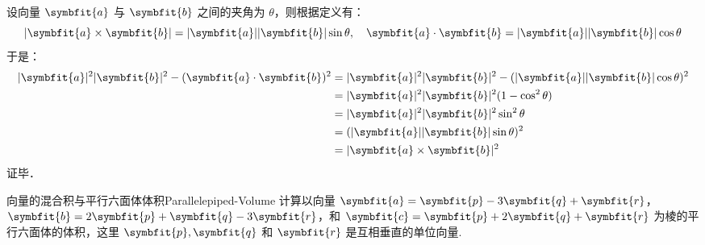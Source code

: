 \begin{myproof}
    设向量 $\symbfit{a}$ 与 $\symbfit{b}$ 之间的夹角为 $\theta$，则根据定义有：
    \begin{equation}
        |\symbfit{a} \times \symbfit{b}| = |\symbfit{a}| |\symbfit{b}| \sin \theta, \quad \symbfit{a} \cdot \symbfit{b} = |\symbfit{a}| |\symbfit{b}| \cos \theta
    \end{equation}
    于是：
    \begin{equation}
        \begin{aligned}
            |\symbfit{a}|^2 |\symbfit{b}|^2 - (\symbfit{a} \cdot \symbfit{b})^2 & = |\symbfit{a}|^2 |\symbfit{b}|^2 - (|\symbfit{a}| |\symbfit{b}| \cos \theta)^2 \\
                                                                                & = |\symbfit{a}|^2 |\symbfit{b}|^2 (1 - \cos^2 \theta)                           \\
                                                                                & = |\symbfit{a}|^2 |\symbfit{b}|^2 \sin^2 \theta                                 \\
                                                                                & = (|\symbfit{a}| |\symbfit{b}| \sin \theta)^2                                   \\
                                                                                & = |\symbfit{a} \times \symbfit{b}|^2
        \end{aligned}
    \end{equation}
    证毕．
\end{myproof}


\begin{problem}{向量的混合积与平行六面体体积}{Parallelepiped-Volume}
    计算以向量 $\symbfit{a} = \symbfit{p} - 3\symbfit{q} + \symbfit{r}$，$\symbfit{b} = 2\symbfit{p} + \symbfit{q} - 3\symbfit{r}$，和 $\symbfit{c} = \symbfit{p} + 2\symbfit{q} + \symbfit{r}$ 为棱的平行六面体的体积，这里 $\symbfit{p}, \symbfit{q}$ 和 $\symbfit{r}$ 是互相垂直的单位向量.
\end{problem}

